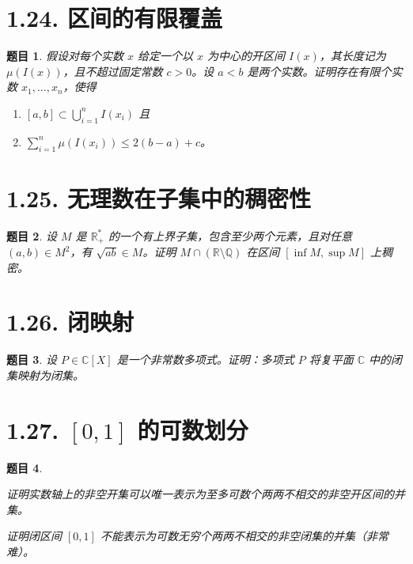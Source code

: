\documentclass[12pt,UTF8]{ctexbook}
\theoremstyle{exercisestyle}
\newtheorem*{exercise}{题目}
\theoremstyle{solutionstyle}
\begin{document}
\section{1.24. 区间的有限覆盖}
\begin{exercise}
假设对每个实数 \(x\) 给定一个以 \(x\) 为中心的开区间 \(I(x)\)，其长度记为 \(\mu(I(x))\)，且不超过固定常数 \(c > 0\)。设 \(a < b\) 是两个实数。证明存在有限个实数 \(x_1, \ldots, x_n\)，使得
\begin{enumerate}[label=(\textit{\roman*})]
\item \([a, b] \subset \bigcup_{i=1}^{n} I(x_i)\) 且
\item \(\sum_{i=1}^{n} \mu(I(x_i)) \leqslant 2(b-a) + c\)。
\end{enumerate}
\end{exercise}

\section{1.25. 无理数在子集中的稠密性}
\begin{exercise}
  设 \( M \) 是 \( \mathbb{R}^*_+ \) 的一个有上界子集，包含至少两个元素，且对任意 \( (a, b) \in M^2 \)，有 \( \sqrt{ab} \in M \)。证明 \( M \cap (\mathbb{R} \setminus \mathbb{Q}) \) 在区间 \( [\inf M, \sup M] \) 上稠密。
\end{exercise}

\section{1.26. 闭映射}\label{application-fermee}
\begin{exercise}
  设 \( P \in \mathbb{C}[X] \) 是一个非常数多项式。证明：多项式 \( P \) 将复平面 \( \mathbb{C} \) 中的闭集映射为闭集。
\end{exercise}

\section{1.27. $[0,1]$ 的可数划分}
\begin{exercise}
  \begin{subquestions}
    \item 证明实数轴上的非空开集可以唯一表示为至多可数个两两不相交的非空开区间的并集。
    \item 证明闭区间 \([0,1]\) 不能表示为可数无穷个两两不相交的非空闭集的并集（非常难）。
  \end{subquestions}
\end{exercise}
\end{document}
